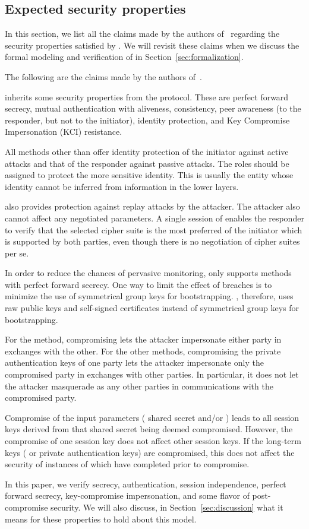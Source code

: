 \subsection{Expected security properties}
In this section, we list all the claims made by the authors of~\cite{selander-lake-edhoc-01} regarding the security properties satisfied by \mEdhoc. We will revisit these claims when we discuss the formal modeling and verification of \mEdhoc{} in Section~\ref{sec:formalization}. 

The following are the claims made by the authors of~\cite{selander-lake-edhoc-01}. 

\mEdhoc{} inherits some security properties from the \mSigma{} protocol. These are perfect forward secrecy, mutual authentication with aliveness, consistency, peer awareness (to the responder, but not to the initiator), identity protection, and Key Compromise Impersonation (KCI) resistance.

All methods other than \mPskPsk{} offer identity protection of the initiator against active attacks and that of the responder against passive attacks. The roles should be assigned to protect the more sensitive identity. This is usually the entity whose identity cannot be inferred from information in the lower layers.

\mEdhoc{} also provides protection against replay attacks by the attacker. The attacker also cannot affect any negotiated parameters. A single session of \mEdhoc{} enables the responder to verify that the selected cipher suite is the most preferred of the initiator which is supported by both parties, even though there is no negotiation of cipher suites per se.

In order to reduce the chances of pervasive monitoring, \mEdhoc{} only supports methods with perfect forward secrecy. One way to limit the effect of breaches is to minimize the use of symmetrical group keys for bootstrapping. \mEdhoc, therefore, uses raw public keys and self-signed certificates instead of symmetrical group keys for bootstrapping.

For the \mPskPsk{} method, compromising \mPsk{} lets the attacker impersonate either party in \mEdhoc{} exchanges with the other. For the other methods, compromising the private authentication keys of one party lets the attacker impersonate only the compromised party in exchanges with other parties. In particular, it does not let the attacker masquerade as any other parties in communications with the compromised party. 

Compromise of the \mHkdf{} input parameters (\mGxy{} shared secret and/or \mPsk) leads to all session keys derived from that shared secret being deemed compromised. However, the compromise of one session key does not affect other session keys. If the long-term keys (\mPsk{} or private authentication keys) are compromised, this does not affect the security of instances of \mEdhoc{} which have completed prior to compromise. 

In this paper, we verify secrecy, authentication, session independence, perfect forward secrecy, key-compromise impersonation, and some flavor of post-compromise security. We will also discuss, in Section~\ref{sec:discussion} what it means for these properties to hold about this model.
